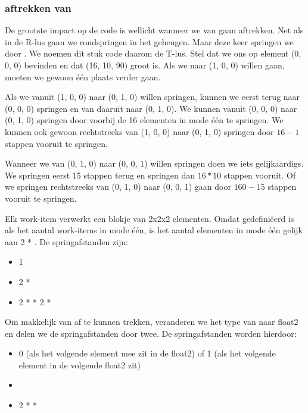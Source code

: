 \subsubsection{\TT{} aftrekken van \CC{}}
De grootste impact op de code is wellicht wanneer we \TT{} van \CC{} gaan aftrekken.  Net als in de R-lus gaan we rondspringen in het geheugen. Maar deze keer springen we door \TT{}.  We noemen dit stuk code daarom de T-lus. Stel dat we ons op element (0, 0, 0) bevinden en dat \TT{} (16, 10, 90) groot is. Als we naar (1, 0, 0) willen gaan, moeten we gewoon \'e\'en plaats verder gaan.

Als we vanuit (1, 0, 0) naar (0, 1, 0) willen springen, kunnen we eerst terug naar (0, 0, 0) springen en van daaruit naar (0, 1, 0). We kunnen vanuit (0, 0, 0) naar (0, 1, 0) springen door voorbij de 16 elementen in mode \'e\'en te springen. We kunnen ook gewoon rechtstreeks van (1, 0, 0) naar (0, 1, 0) springen door $16-1$ stappen vooruit te springen.

Wanneer we van (0, 1, 0) naar (0, 0, 1) willen springen doen we iets gelijkaardigs. We springen eerst 15 stappen terug en springen dan $16 * 10$ stappen vooruit. Of we springen rechtstreeks van (0, 1, 0) naar (0, 0, 1) gaan door $160 - 15$ stappen vooruit te springen.

Elk work-item verwerkt een blokje van 2x2x2 elementen. Omdat  gedefini\"eerd is als het aantal work-items in mode \'e\'en, is het aantal elementen in mode \'e\'en gelijk aan 2 * . De springafstanden zijn:
\begin{itemize}
    \item 1
    \item 2 * 
    \item 2 *  * 2 * 
\end{itemize}
Om \TT{} makkelijk van \CC{} af te kunnen trekken, veranderen we het type van \TT{} naar float2 en delen we de springafstanden door twee. De springafstanden worden hierdoor:
\begin{itemize}
	\item 0 (als het volgende element mee zit in de float2) of 1 (als het volgende element in de volgende float2 zit)
    \item {}
    \item 2 *  * 
\end{itemize}

